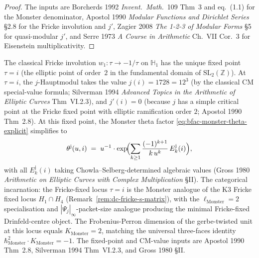 \begin{proof}
The inputs are Borcherds 1992 \emph{Invent.\ Math.}~109 Thm~3 and
eq.~(1.1) for the Monster denominator, Apostol 1990
\emph{Modular Functions and Dirichlet Series} \S2.8 for the Fricke
involution and $j'$, Zagier 2008 \emph{The 1-2-3 of Modular Forms}
\S5 for quasi-modular $j'$, and Serre 1973
\emph{A Course in Arithmetic} Ch.~VII Cor.~3 for Eisenstein
multiplicativity.
\end{proof}

\begin{remark}[Fricke fixed point \texorpdfstring{$\tau = i$}{tau = i} as the Monster Lusztig locus]
\label{rem:bfac-fricke-fixed-tau-i}
The classical Fricke involution $w_1\colon\tau\to -1/\tau$ on
$\mathbb{H}_1$ has the unique fixed point $\tau = i$ (the elliptic
point of order~$2$ in the fundamental domain of $\mathrm{SL}_2(\mathbb Z)$).
At $\tau = i$, the $j$-Hauptmodul takes the value
$j(i) = 1728 = 12^3$ (by the classical CM special-value formula;
Silverman 1994 \emph{Advanced Topics in the Arithmetic of Elliptic
Curves} Thm~VI.2.3), and $j'(i) = 0$ (because $j$ has a simple
critical point at the Fricke fixed point with elliptic ramification
order $2$; Apostol 1990 Thm~2.8). At this fixed point,
the Monster theta factor \eqref{eq:bfac-monster-theta-explicit}
simplifies to
\[
 \theta^{\mathrm j}(u, i)
 \;=\;
 u^{-1}\cdot\exp\!\Bigl(\sum_{k\geq 1} \frac{(-1)^{k+1}}{k\,u^k}\,
 E_k^{\mathrm j}(i)\Bigr),
\]
with all $E_k^{\mathrm j}(i)$ taking Chowla--Selberg-determined
algebraic values (Gross 1980 \emph{Arithmetic on Elliptic Curves
with Complex Multiplication} \S II). The categorical incarnation:
the Fricke-fixed locus $\tau = i$ is the Monster analogue of the
K3 Fricke fixed locus $H_1\cap H_4$
(Remark~\ref{rem:dc-fricke-s-matrix}), with the
$\ell_{\mathrm{Monster}} = 2$ specialisation and
$|\Psi_{j}|_{\infty}$-packet-size analogue producing the minimal
Fricke-fixed Drinfeld-centre object. The Frobenius-Perron dimension
of the gerbe-twisted unit at this locus equals
$K_{\mathrm{Monster}} = 2$, matching the universal three-faces
identity $\hbar^2_{\mathrm{Monster}}\cdot K_{\mathrm{Monster}} = -1$.
The fixed-point and CM-value inputs are Apostol 1990 Thm~2.8,
Silverman 1994 Thm~VI.2.3, and Gross 1980 \S II.
\end{remark}


